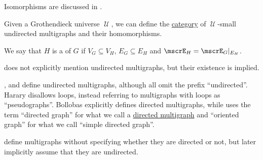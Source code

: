 \begin{definition}
\begin{thmenum}[resume=def:undirected_multigraph]
    Isomorphisms are discussed in .

    \mimprovised Given a Grothendieck universe \( \mscrU \), we can define the \hyperref[def:category]{category} of \( \mscrU \)-small undirected multigraphs and their homomorphisms.

    \mimprovised We say that \( H \) is a  of \( G \) if \( V_G \subseteq V_H \), \( E_G \subseteq E_H \) and \( \mscrE_H = \mscrE_G\restr_{E_H} \).
  \end{thmenum}
\end{definition}
\begin{comments}
  \item {} does not explicitly mention undirected multigraphs, but their existence is implied.

  ,  and  define undirected multigraphs, although all omit the prefix \enquote{undirected}. Harary disallows loops, instead referring to multigraphs with loops as \enquote{pseudographs}. Bollobas explicitly defines directed multigraphs, while  uses the term \enquote{directed graph} for what we call a \hyperref[def:directed_multigraph]{directed multigraph} and \enquote{oriented graph} for what we call \enquote{simple directed graph}.

   define multigraphs without specifying whether they are directed or not, but later implicitly assume that they are undirected.
\end{comments}

